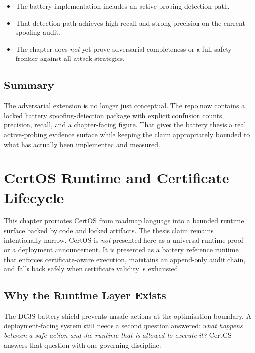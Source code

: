 \begin{itemize}
  \item The battery implementation includes an active-probing detection path.
  \item That detection path achieves high recall and strong precision on the
    current spoofing audit.
  \item The chapter does \emph{not} yet prove adversarial completeness or a
    full safety frontier against all attack strategies.
\end{itemize}

\subsection{Summary}

The adversarial extension is no longer just conceptual.  The repo now
contains a locked battery spoofing-detection package with explicit confusion
counts, precision, recall, and a chapter-facing figure.  That gives the
battery thesis a real active-probing evidence surface while keeping the claim
appropriately bounded to what has actually been implemented and measured.


\section{CertOS Runtime and Certificate Lifecycle}
\label{ch:certos-runtime}

This chapter promotes CertOS from roadmap language into a bounded runtime
surface backed by code and locked artifacts.  The thesis claim remains
intentionally narrow.  CertOS is \emph{not} presented here as a universal
runtime proof or a deployment announcement.  It is presented as a battery
reference runtime that enforces certificate-aware execution, maintains an
append-only audit chain, and falls back safely when certificate validity is
exhausted.

\subsection{Why the Runtime Layer Exists}

The DC3S battery shield prevents unsafe actions at the optimisation
boundary.  A deployment-facing system still needs a second question
answered: \emph{what happens between a safe action and the runtime that is
allowed to execute it?}  CertOS answers that question with one governing
discipline:

